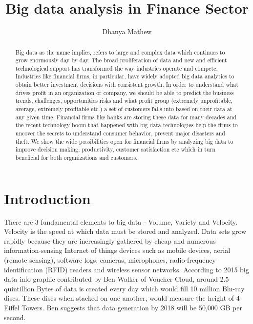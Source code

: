 \documentclass[sigconf]{acmart}
\begin{document}
\title{Big data analysis in Finance Sector}


\author{Dhanya Mathew}

\renewcommand{\shortauthors}{B. Trovato et al.}


\begin{abstract}

Big data as the name implies, refers to large and complex data which continues to grow enormously day by day. The broad proliferation of data and new and efficient technological support has transformed the way industries operate and compete. Industries like financial firms, in particular, have widely adopted big data analytics to obtain better investment decisions with consistent growth. In order to understand what drives profit in an organization or company, we should be able to predict the business trends, challenges, opportunities risks and what profit group (extremely unprofitable, average, extremely profitable etc.) a set of customers falls into based on their data at any given time. Financial firms like banks are storing these data for many decades and the recent technology boom that happened with big data technologies help the firms to uncover the secrets to understand consumer behavior, prevent major disasters and theft. We show the wide possibilities open for financial firms by analyzing big data to improve decision making, productivity, customer satisfaction etc which in turn beneficial for both organizations and customers.
\end{abstract}



\maketitle

\section{Introduction}

There are 3 fundamental elements to big data - Volume, Variety and Velocity. Velocity is the speed at which data must be stored and analyzed\cite{how-big-data-has-changed-finance}. Data sets grow rapidly because they are increasingly gathered by cheap and numerous information-sensing Internet of things devices such as mobile devices, aerial (remote sensing), software logs, cameras, microphones, radio-frequency identification (RFID) readers and wireless sensor networks\cite{/wiki/Big_data}. According to 2015 big data info graphic contributed by Ben Walker of Voucher Cloud, around 2.5 quintillion Bytes of data is created every day which would fill 10 million Blu-ray discs. These discs when stacked on one another, would measure the height of 4 Eiffel Towers. Ben suggests that data generation by 2018 will be 50,000 GB per second\cite{how-much-data-is-created-daily}. 
\end{document}
